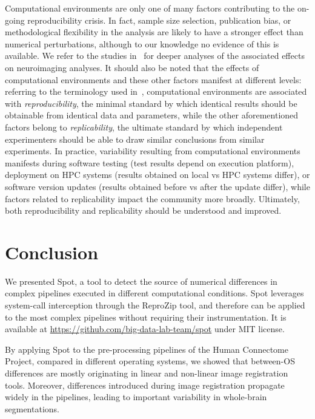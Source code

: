 \documentclass[a4paper,num-refs]{oup-contemporary}
\newcommand{\revised}[1]{\color{blue}#1\color{black}\xspace}
\newcommand{\reprozip}[0]{ReproZip\xspace}
\newcommand{\toolname}[0]{Spot\xspace}
\begin{document}
\revised{
Computational environments are only one of many factors contributing to the
on-going reproducibility crisis. In fact, sample size selection,
publication bias, or methodological flexibility in the analysis are likely
to have a stronger effect than numerical perturbations, although
to our knowledge no evidence of this is available. We refer to the
studies in~\cite{botvinik2020variability,bowring2019exploring,bhagwat2020understanding,kennedy2019everything} for deeper
analyses of the associated effects on neuroimaging analyses. It should also be
noted that the effects of computational environments and these other
factors manifest at different levels: referring to the terminology used
in~\cite{peng2011reproducible}, computational environments are associated with
\emph{reproducibility}, the minimal standard by which identical results
should be obtainable from identical data and parameters, while the other
aforementioned factors belong to \emph{replicability}, the ultimate
standard by which independent experimenters should be able to draw similar
conclusions from similar experiments. In practice, variability resulting
from computational environments manifests during software testing (test
results depend on execution platform), deployment on HPC systems (results
obtained on local vs HPC systems differ), or software version updates
(results obtained before vs after the update differ), while factors related
to replicability impact the community more broadly. Ultimately, both
reproducibility and replicability should be understood and improved.
}

\section{Conclusion}

We presented \toolname, a tool to detect the source of numerical
differences in complex pipelines executed in different computational
conditions. \toolname leverages system-call interception through the
\reprozip tool, and therefore can be applied to the most complex pipelines
without requiring their instrumentation. It is available at
\url{https://github.com/big-data-lab-team/spot} under MIT license.

By applying \toolname to the pre-processing pipelines of the Human
Connectome Project, compared in different operating systems, we showed that
between-OS differences are mostly originating in linear and non-linear
image registration tools. Moreover, differences introduced during image
registration propagate widely in the pipelines, leading to important
variability in whole-brain segmentations.
\end{document}
